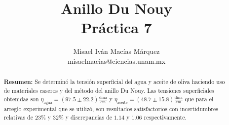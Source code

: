 \documentclass[DIV=calc, paper=a4, fontsize=11pt]{scrartcl}
\title{Anillo Du Nouy\\ %
Práctica 7} %
\author{Misael Iván Macías Márquez\\
misaelmacias@ciencias.unam.mx}
\begin{document}
\maketitle


\begin{abstract}
\textbf{Resumen:} Se determinó  la tensión superficial del agua y aceite de oliva haciendo uso de materiales caseros y del método del anillo Du Nouy. Las tensiones superficiales obtenidas son $\eta_{\text{agua}}=(97.5 \pm 22.2) \frac{\text{dina}}{\text{cm}}$ y $\eta_{\text{aceite}}= (48.7 \pm 15.8) \frac{\text{dina}}{\text{cm}}$ que para el arreglo experimental que se utilizó, son resultados satisfactorios con incertidumbres relativas de $23\%$ y $32\%$ y discrepancias de $1.14$ y $1.06$ respectivamente.
\end{abstract}
\end{document}
